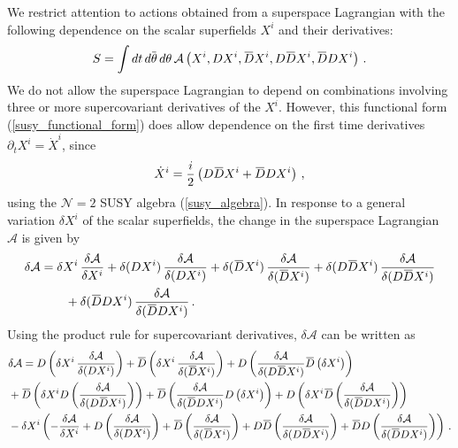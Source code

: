 \documentclass[12pt]{article}
\numberwithin{equation}{section}
\newcommand{\overbar}[1]{\mkern 1.5mu\overline{\mkern-1.5mu#1\mkern-1.5mu}\mkern 1.5mu}
\newcommand{\Dbar}{\overbar{D}}
\newcommand{\thetab}{\overbar{\theta}}
\begin{document}
We restrict attention to actions obtained from a superspace Lagrangian with the following dependence on the scalar superfields $X^i$ and their derivatives:
%
\begin{align}\label{susy_functional_form}
    S = \int dt \, d \thetab \, d \theta \, \mathcal{A} \left( X^i, D X^i, \Dbar X^i, D \Dbar X^i , \Dbar D X^i \right) \, .
\end{align}
%
We do not allow the superspace Lagrangian to depend on combinations involving three or more supercovariant derivatives of the $X^i$. However, this functional form (\ref{susy_functional_form}) does allow dependence on the first time derivatives $\partial_t X^i = \dot{X}^i$, since
%
\begin{align}
    \dot{X}^i = \frac{i}{2} \left( D \Dbar X^i + \Dbar D X^i \right) \, , 
\end{align}
%
using the $\mathcal{N} = 2$ SUSY algebra (\ref{susy_algebra}). In response to a general variation $\delta X^i$ of the scalar superfields, the change in the superspace Lagrangian $\mathcal{A}$ is given by
%
\begin{align}\label{general_susy_qm_variation}
    \delta \mathcal{A} &= \delta X^i \, \frac{\delta \mathcal{A}}{\delta X^i}  + \delta ( D X^i ) \, \frac{\delta \mathcal{A}}{\delta ( D X^i ) }  + \delta ( \Dbar X^i ) \, \frac{\delta \mathcal{A}}{\delta ( \Dbar X^i ) } + \delta ( D \Dbar X^i ) \, \frac{\delta \mathcal{A}}{\delta ( D \Dbar X^i ) } \nonumber \\
    &\qquad + \delta ( \Dbar D  X^i ) \, \frac{\delta \mathcal{A}}{\delta ( \Dbar D  X^i ) }  \, .
\end{align}
%
Using the product rule for supercovariant derivatives, $\delta \mathcal{A}$ can be written as
%
\begin{align}\label{susy_variation_ibp}
    \hspace{-10pt} &\delta \mathcal{A} = D \left( \delta X^i  \, \frac{\delta \mathcal{A}}{\delta ( D X^i ) } \right) + \Dbar \left( \delta X^i  \, \frac{\delta \mathcal{A}}{\delta ( \Dbar X^i ) } \right) + D \left( \frac{\delta \mathcal{A}}{\delta (D \Dbar X^i)} \Dbar \left( \delta X^i \right) \right)  \nonumber \\
    &+ \Dbar \left( \delta X^i D \left( \frac{\delta \mathcal{A}}{\delta (D \Dbar X^i)} \right) \right) + \Dbar \left( \frac{\delta \mathcal{A}}{\delta  (\Dbar D  X^i)} D \left( \delta X^i \right) \right) + D \left( \delta X^i \Dbar \left( \frac{\delta \mathcal{A}}{\delta (\Dbar D X^i)} \right) \right) \nonumber \\
    &- \delta X^i \left( - \frac{\delta \mathcal{A}}{\delta X^i} + D \left( \frac{\delta \mathcal{A}}{\delta ( D X^i ) } \right) + \Dbar \left( \frac{\delta \mathcal{A}}{\delta ( \Dbar X^i ) } \right) + D \Dbar \left( \frac{\delta \mathcal{A}}{\delta ( D \Dbar X^i ) } \right) + \Dbar D  \left( \frac{\delta \mathcal{A}}{\delta (  \Dbar D  X^i ) } \right) \right) \, .
\end{align}
\end{document}
